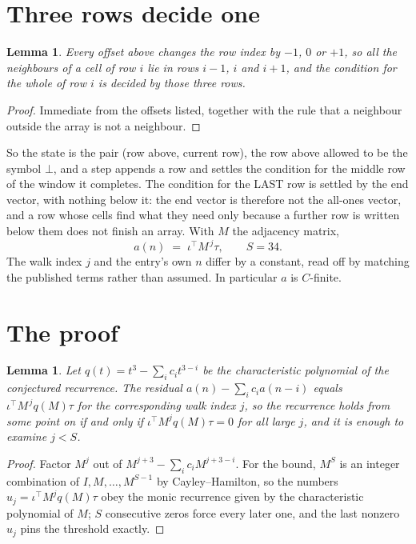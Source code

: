 \documentclass[11pt,a4paper]{article}
\theoremstyle{plain}
\newtheorem{lemma}[theorem]{Lemma}
\theoremstyle{definition}
\begin{document}
\section{Three rows decide one}

\begin{lemma}\label{lem:win}
Every offset above changes the row index by $-1$, $0$ or $+1$, so all the neighbours of a cell
of row $i$ lie in rows $i-1$, $i$ and $i+1$, and the condition for the whole of row $i$ is
decided by those three rows.
\end{lemma}

\begin{proof}
Immediate from the offsets listed, together with the rule that a neighbour outside the array is
not a neighbour.
\end{proof}

So the state is the pair (row above, current row), the row above allowed to be the symbol
$\bot$, and a step appends a row and settles the condition for the middle row of the window it
completes. The condition for the LAST row is settled by the end vector, with nothing below it:
the end vector is therefore not the all-ones vector, and a row whose cells find what they need
only because a further row is written below them does not finish an array. With $M$ the
adjacency matrix,
\[
a(n)\;=\;\iota^{\!\top}M^{\,j}\tau ,\qquad S=34.
\]
The walk index $j$ and the entry's own $n$ differ by a constant, read off by matching the
published terms rather than assumed. In particular $a$ is $C$-finite.

\section{The proof}

\begin{lemma}\label{lem:crit}
Let $q(t)=t^{3}-\sum_i c_it^{3-i}$ be the characteristic polynomial of the
conjectured recurrence. The residual $a(n)-\sum_ic_ia(n-i)$ equals
$\iota^{\!\top}M^{\,j}q(M)\tau$ for the corresponding walk index $j$, so the recurrence
holds from some point on if and only if $\iota^{\!\top}M^{j}q(M)\tau=0$ for all large $j$,
and it is enough to examine $j<S$.
\end{lemma}

\begin{proof}
Factor $M^{j}$ out of $M^{j+3}-\sum_ic_iM^{j+3-i}$. For the bound, $M^{S}$
is an integer combination of $I,M,\dots,M^{S-1}$ by Cayley--Hamilton, so the numbers
$u_j=\iota^{\!\top}M^{j}q(M)\tau$ obey the monic recurrence given by the characteristic
polynomial of $M$; $S$ consecutive zeros force every later one, and the last nonzero $u_j$
pins the threshold exactly.
\end{proof}
\end{document}
